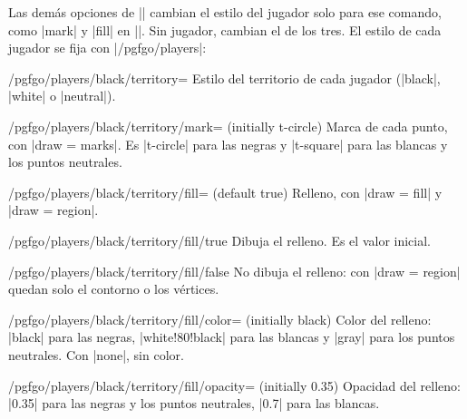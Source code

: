 	Las demás opciones de |\territory| cambian el estilo del jugador solo para ese comando, como |mark| y |fill| en ||. Sin jugador, cambian el de los tres. El estilo de cada jugador se fija con |/pgfgo/players|:

	\begin{key}{/pgfgo/players/black/territory=}
		Estilo del territorio de cada jugador (|black|, |white| o |neutral|).
	\end{key}

	\begin{key}{/pgfgo/players/black/territory/mark= (initially t-circle)}
		Marca de cada punto, con |draw = marks|. Es |t-circle| para las negras y |t-square| para las blancas y los puntos neutrales.

		\begin{codeexample}[]
			\begin{goban}[5]
			\end{goban}
		\end{codeexample}
	\end{key}

	\begin{key}{/pgfgo/players/black/territory/fill= (default true)}
		Relleno, con |draw = fill| y |draw = region|.
	\end{key}

	\begin{key}{/pgfgo/players/black/territory/fill/true}
		Dibuja el relleno. Es el valor inicial.
	\end{key}

	\begin{key}{/pgfgo/players/black/territory/fill/false}
		No dibuja el relleno: con |draw = region| quedan solo el contorno o los vértices.
	\end{key}

	\begin{key}{/pgfgo/players/black/territory/fill/color= (initially black)}
		Color del relleno: |black| para las negras, |white!80!black| para las blancas y |gray| para los puntos neutrales. Con |none|, sin color.
	\end{key}

	\begin{key}{/pgfgo/players/black/territory/fill/opacity= (initially 0.35)}
		Opacidad del relleno: |0.35| para las negras y los puntos neutrales, |0.7| para las blancas.

		\begin{codeexample}[]
			\begin{goban}[5]
			\end{goban}
		\end{codeexample}
	\end{key}

